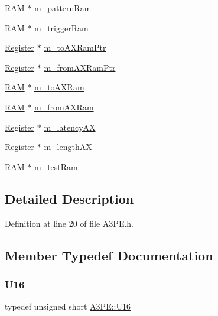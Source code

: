 \begin{DoxyCompactItemize}
\item 
\hyperlink{classRAM}{R\+AM} $\ast$ \hyperlink{classA3PE_a84d5deabbbf2d513144dd6a00390182e}{m\+\_\+pattern\+Ram}
\item 
\hyperlink{classRAM}{R\+AM} $\ast$ \hyperlink{classA3PE_a2b40e3937f0aa008ec7073acc5029fcc}{m\+\_\+trigger\+Ram}
\item 
\hyperlink{classRegister}{Register} $\ast$ \hyperlink{classA3PE_aae1b8b2e96bba94535bd4de766bd7e65}{m\+\_\+to\+A\+X\+Ram\+Ptr}
\item 
\hyperlink{classRegister}{Register} $\ast$ \hyperlink{classA3PE_a27ae9467bc128e46dd80443245df096a}{m\+\_\+from\+A\+X\+Ram\+Ptr}
\item 
\hyperlink{classRAM}{R\+AM} $\ast$ \hyperlink{classA3PE_ae586a3d2fd21556e84e1af656e3430b5}{m\+\_\+to\+A\+X\+Ram}
\item 
\hyperlink{classRAM}{R\+AM} $\ast$ \hyperlink{classA3PE_a91d3dd3e87e2c948dd67cb82a63d3858}{m\+\_\+from\+A\+X\+Ram}
\item 
\hyperlink{classRegister}{Register} $\ast$ \hyperlink{classA3PE_a061472eb539bb6ac99f4fa11a760eeaf}{m\+\_\+latency\+AX}
\item 
\hyperlink{classRegister}{Register} $\ast$ \hyperlink{classA3PE_a87c93a38343873f2d52741deca4750ce}{m\+\_\+length\+AX}
\item 
\hyperlink{classRAM}{R\+AM} $\ast$ \hyperlink{classA3PE_ad788e41ef5c674ab1a7671f3db0ffef6}{m\+\_\+test\+Ram}
\end{DoxyCompactItemize}


\subsection{Detailed Description}


Definition at line 20 of file A3\+P\+E.\+h.



\subsection{Member Typedef Documentation}
\mbox{\label{classA3PE_a2ee28b2899c3cc4f22821b4138758c28}} 
\subsubsection{\texorpdfstring{U16}{U16}}
{\footnotesize\ttfamily typedef unsigned short \hyperlink{classA3PE_a2ee28b2899c3cc4f22821b4138758c28}{A3\+P\+E\+::\+U16}}



